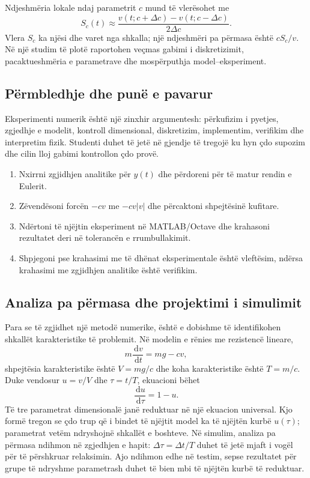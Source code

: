 \documentclass[11pt,oneside,openany]{book}
\newcommand{\dd}{\,\mathrm{d}}
\begin{document}
Ndjeshmëria lokale ndaj parametrit $c$ mund të vlerësohet me
\begin{equation}
 S_c(t)\approx\frac{v(t;c+\Delta c)-v(t;c-\Delta c)}{2\Delta c}.
\end{equation}
Vlera $S_c$ ka njësi dhe varet nga shkalla; një ndjeshmëri pa përmasa është $cS_c/v$. Në një studim të plotë raportohen veçmas gabimi i diskretizimit, pacaktueshmëria e parametrave dhe mospërputhja model--eksperiment.

\subsection{Përmbledhje dhe punë e pavarur}
Eksperimenti numerik është një zinxhir argumentesh: përkufizim i pyetjes, zgjedhje e modelit, kontroll dimensional, diskretizim, implementim, verifikim dhe interpretim fizik. Studenti duhet të jetë në gjendje të tregojë ku hyn çdo supozim dhe cilin lloj gabimi kontrollon çdo provë.

\begin{enumerate}
\item Nxirrni zgjidhjen analitike për $y(t)$ dhe përdoreni për të matur rendin e Eulerit.
\item Zëvendësoni forcën $-cv$ me $-cv|v|$ dhe përcaktoni shpejtësinë kufitare.
\item Ndërtoni të njëjtin eksperiment në MATLAB/Octave dhe krahasoni rezultatet deri në tolerancën e rrumbullakimit.
\item Shpjegoni pse krahasimi me të dhënat eksperimentale është vleftësim, ndërsa krahasimi me zgjidhjen analitike është verifikim.
\end{enumerate}



\subsection{Analiza pa përmasa dhe projektimi i simulimit}
Para se të zgjidhet një metodë numerike, është e dobishme të identifikohen shkallët karakteristike të problemit. Në modelin e rënies me rezistencë lineare,
\begin{equation}
 m\frac{\dd v}{\dd t}=mg-cv,
\end{equation}
shpejtësia karakteristike është $V=mg/c$ dhe koha karakteristike është $T=m/c$. Duke vendosur $u=v/V$ dhe $\tau=t/T$, ekuacioni bëhet
\begin{equation}
 \frac{\dd u}{\dd\tau}=1-u.
\end{equation}
Të tre parametrat dimensionalë janë reduktuar në një ekuacion universal. Kjo formë tregon se çdo trup që i bindet të njëjtit model ka të njëjtën kurbë $u(\tau)$; parametrat vetëm ndryshojnë shkallët e boshteve. Në simulim, analiza pa përmasa ndihmon në zgjedhjen e hapit: $\Delta\tau=\Delta t/T$ duhet të jetë mjaft i vogël për të përshkruar relaksimin. Ajo ndihmon edhe në testim, sepse rezultatet për grupe të ndryshme parametrash duhet të bien mbi të njëjtën kurbë të reduktuar.
\end{document}
